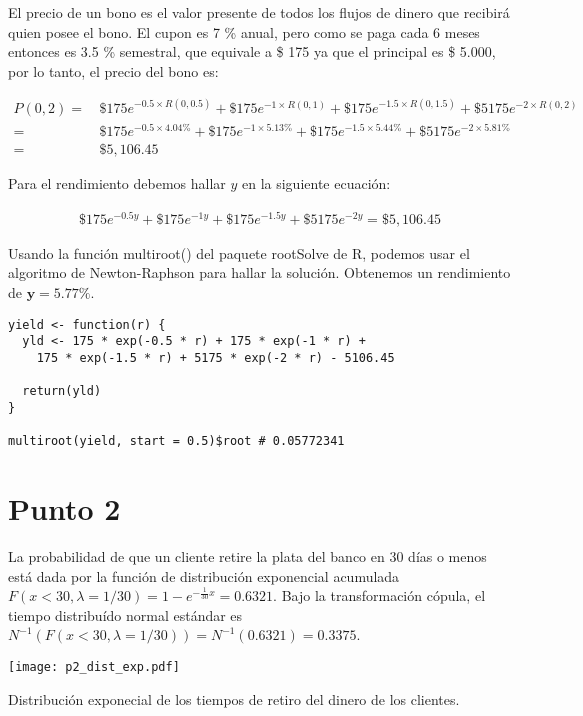 \documentclass{tufte-handout}
\begin{document}
El precio de un bono es el valor presente de todos los flujos de dinero que recibirá quien posee el bono. El cupon es 7 \% anual, pero como se paga cada 6 meses entonces es 3.5 \% semestral, que equivale a \$ 175 ya que el principal es \$ 5.000, por lo tanto, el precio del bono es:

\begin{align*}
P(0,2) = \, & \$ 175e^{-0.5\times R(0,0.5)} + \$ 175e^{-1\times R(0,1)} + \$ 175e^{-1.5\times R(0,1.5)} + \$ 5175e^{-2\times R(0,2)} \\
 = \, & \$ 175e^{-0.5\times 4.04 \%} + \$ 175e^{-1\times 5.13 \%} + \$ 175e^{-1.5\times 5.44 \%} + \$ 5175e^{-2\times 5.81 \%} \\
= \, & \$ 5,106.45
\end{align*}

Para el rendimiento debemos hallar $y$ en la siguiente ecuación:

\begin{align*}
\$ 175e^{-0.5y} + \$ 175e^{-1 y} + \$ 175e^{-1.5 y} + \$ 5175e^{-2 y} = \$ 5,106.45
\end{align*}

Usando la función multiroot() del paquete rootSolve de R, podemos usar el algoritmo de Newton-Raphson para hallar la solución. Obtenemos un rendimiento de $\mathbf{y=5.77 \%}$.

\begin{verbatim}
yield <- function(r) {
  yld <- 175 * exp(-0.5 * r) + 175 * exp(-1 * r) +
    175 * exp(-1.5 * r) + 5175 * exp(-2 * r) - 5106.45
  
  return(yld)
}

multiroot(yield, start = 0.5)$root # 0.05772341
\end{verbatim}


\section*{Punto 2}

La probabilidad de que un cliente retire la plata del banco en 30 días o menos está dada por la función de distribución exponencial acumulada $F(x < 30, \lambda = 1/30) = 1 - e^{-\frac{1}{30} x} = 0.6321$. Bajo la transformación cópula, el tiempo distribuído normal estándar es $N^{-1}(F(x < 30, \lambda = 1/30))=N^{-1}(0.6321)=0.3375$.

\begin{marginfigure}[-2cm]
\texttt{[image: p2\_dist\_exp.pdf]}
\caption{Distribución exponecial de los tiempos de retiro del dinero de los clientes.}
\end{marginfigure}
\end{document}

